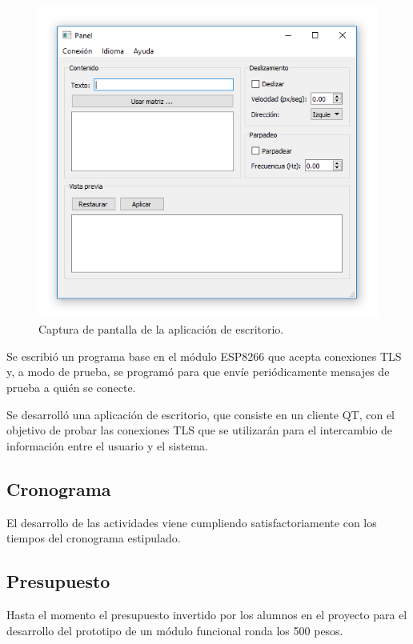 \begin{figure}
	\centering
	\label{fig:screenshot-panel}
	\includegraphics[scale=0.8]{imagenes/screenshot-panel.png}
	\caption{Captura de pantalla de la aplicación de escritorio.}
\end{figure}

Se escribió un programa base en el módulo ESP8266 que acepta conexiones TLS y, a modo de prueba, se programó para que envíe periódicamente mensajes de prueba a quién se conecte.

Se desarrolló una aplicación de escritorio, que consiste en un cliente QT, con el objetivo de probar las conexiones TLS que se utilizarán para el intercambio de información entre el usuario y el sistema.

\subsection{Cronograma}
El desarrollo de las actividades viene cumpliendo satisfactoriamente con los tiempos del cronograma estipulado.

\subsection{Presupuesto}
Hasta el momento el presupuesto invertido por los alumnos en el proyecto para el desarrollo del prototipo de un módulo funcional ronda los 500 pesos.